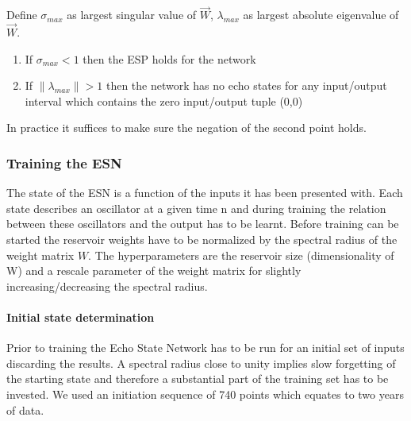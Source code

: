 \begin{frm-thm}
Define $\sigma_{max}$ as largest singular value of $\vec{W}$, $\lambda_{max}$ as largest absolute eigenvalue of $\vec{W}$.
\begin{enumerate}
\item If $\sigma_{max} < 1$ then the ESP holds for the network
\item If $\|\lambda_{max}\| > 1$ then the network has no echo states for any input/output interval which contains the zero input/output tuple (0,0)
\end{enumerate}
\end{frm-thm}
In practice it suffices to make sure the negation of the second point holds.

\subsubsection*{Training the ESN}
The state of the ESN is a function of the inputs it has been presented with. Each state describes an oscillator at a given time n and during training the relation between these oscillators and the output has to be learnt. Before training can be started the reservoir weights have to be normalized by the spectral radius of the weight matrix $W$. The hyperparameters are the reservoir size (dimensionality of W) and a rescale parameter of the weight matrix for slightly increasing/decreasing the spectral radius.

\paragraph*{Initial state determination}
Prior to training the Echo State Network has to be run for an initial set of inputs discarding the results. A spectral radius close to unity implies slow forgetting of the starting state and therefore a substantial part of the training set has to be invested. We used an initiation sequence of 740 points which equates to two years of data.


